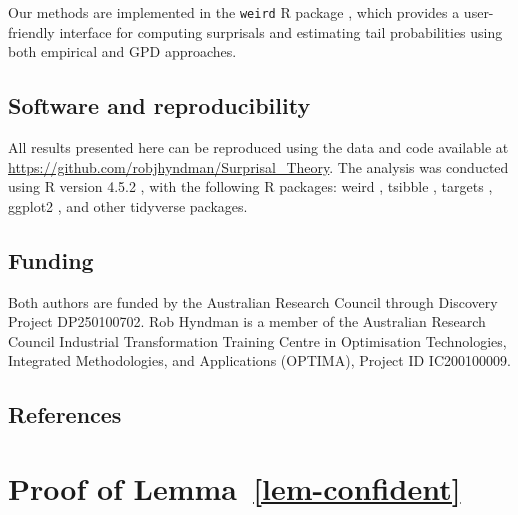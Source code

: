 \documentclass[
  12pt]{article}
\theoremstyle{plain}
\theoremstyle{plain}
\theoremstyle{definition}
\theoremstyle{plain}
\theoremstyle{remark}
\begin{document}
Our methods are implemented in the \texttt{weird} R package
\citep{Rweird}, which provides a user-friendly interface for computing
surprisals and estimating tail probabilities using both empirical and
GPD approaches.

\subsection*{Software and
reproducibility}\label{software-and-reproducibility}

All results presented here can be reproduced using the data and code
available at \url{https://github.com/robjhyndman/Surprisal_Theory}. The
analysis was conducted using R version 4.5.2 \citep{R}, with the
following R packages: weird \citep{Rweird}, tsibble \citep{Rtsibble},
targets \citep{targets, targetspaper}, ggplot2
\citep{ggplot2, ggplotbook}, and other tidyverse \citep{tidyverse}
packages.

\subsection*{Funding}\label{funding}

Both authors are funded by the Australian Research Council through
Discovery Project DP250100702. Rob Hyndman is a member of the Australian
Research Council Industrial Transformation Training Centre in
Optimisation Technologies, Integrated Methodologies, and Applications
(OPTIMA), Project ID IC200100009.

\subsection*{References}\label{references}

\renewcommand{\bibsection}{}


\newpage{}

\appendix

\section{\texorpdfstring{Proof of
Lemma~\ref{lem-confident}}{Proof of Lemma~}}\label{proof-of-lem-confident}
\end{document}
